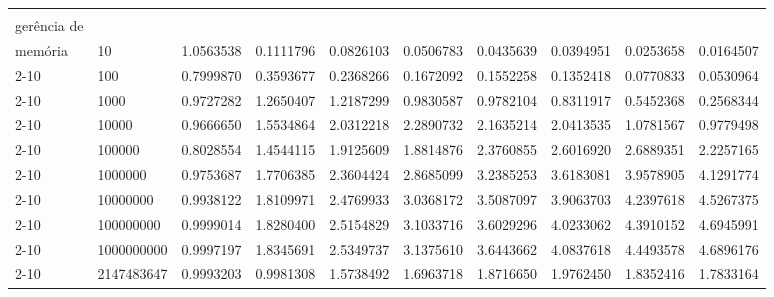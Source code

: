 \begin{flushleft}
{\begin{tabular}{|p{1.5cm}|p{1.2cm}|p{1.3cm}|p{1.3cm}|p{1.3cm}|p{1.3cm}|p{1.3cm}|p{1.3cm}|p{1.3cm}|p{1.3cm}|}
\rule{0pt}{4ex}\multirow{9}{*}{\shortstack[l]{\textit{Speedup} com\\gerência de \\memória}} 
&10 				& 	1.0563538	 	& 0.1111796 		& 0.0826103 		& 0.0506783 		& 0.0435639 		& 0.0394951 		& 0.0253658 		& 0.0164507		\\\cline{2-10}
&100 			& 	0.7999870 		& 0.3593677 		& 0.2368266 		& 0.1672092 		& 0.1552258 		& 0.1352418 		& 0.0770833 		& 0.0530964		\\\cline{2-10}
&1000 			& 	0.9727282 		& 1.2650407 		& 1.2187299 		& 0.9830587 		& 0.9782104 		& 0.8311917 		& 0.5452368 		& 0.2568344		\\\cline{2-10}
&10000 			& 	0.9666650 		& 1.5534864 		& 2.0312218 		& 2.2890732 		& 2.1635214	 	& 2.0413535 		& 1.0781567 		& 0.9779498		\\\cline{2-10}
&100000 			& 	0.8028554 		& 1.4544115 		& 1.9125609 		& 1.8814876 		& 2.3760855	 	& 2.6016920 		& 2.6889351 		& 2.2257165		\\\cline{2-10}
&1000000			& 	0.9753687 		& 1.7706385 		& 2.3604424 		& 2.8685099 		& 3.2385253	 	& 3.6183081 		& 3.9578905	 	& 4.1291774		\\\cline{2-10}
&10000000 		& 	0.9938122 		& 1.8109971 		& 2.4769933 		& 3.0368172 		& 3.5087097	 	& 3.9063703	 	& 4.2397618 		& 4.5267375		\\\cline{2-10}
&100000000 		& 	0.9999014 		& 1.8280400 		& 2.5154829 		& 3.1033716	 	& 3.6029296	 	& 4.0233062	 	& 4.3910152	 	& 4.6945991		\\\cline{2-10}
&1000000000		& 	0.9997197 		& 1.8345691 		& 2.5349737 		& 3.1375610	 	& 3.6443662	 	& 4.0837618	 	& 4.4493578 		& 4.6896176		\\\cline{2-10}
&2147483647		& 	0.9993203 		& 0.9981308 		& 1.5738492 		& 1.6963718	 	& 1.8716650	 	& 1.9762450	 	& 1.8352416	 	& 1.7833164		\\\hline



\end{tabular}}
\end{flushleft}
